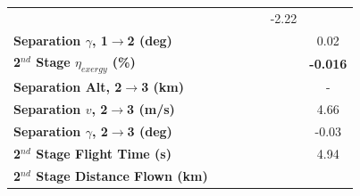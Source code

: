 \begin{table}[!ht]
\begin{tabular}{l c c c c c c}
	& \firstsecondSeparationvmFuelNinetyFiveNoReturn
	& \firstsecondSeparationvmFuelStandardNoReturn
	& \firstsecondSeparationvmFuelOneHundredFiveNoReturn
	& \firstsecondSeparationvmFuelOneHundredTenNoReturn
	&-2.22
	\\
	\textbf{Separation $\gamma$, 1$\rightarrow$2 (deg)}
	& \firstsecondSeparationgammamFuelNinetyNoReturn
	& \firstsecondSeparationgammamFuelNinetyFiveNoReturn
	& \firstsecondSeparationgammamFuelStandardNoReturn
	& \firstsecondSeparationgammamFuelOneHundredFiveNoReturn
	& \firstsecondSeparationgammamFuelOneHundredTenNoReturn
	&0.02
	\\
	\hline 
	\textbf{2$^{nd}$ Stage $\eta_{exergy}$ (\%)}
	& \textbf{\secondExergyEffmFuelNinetyNoReturn}
	& \textbf{\secondExergyEffmFuelNinetyFiveNoReturn}
	& \textbf{\secondExergyEffmFuelStandardNoReturn}
	& \textbf{\secondExergyEffmFuelOneHundredFiveNoReturn}
	& \textbf{\secondExergyEffmFuelOneHundredTenNoReturn}
	& \textbf{-0.016}
	\\
	\textbf{Separation Alt, 2$\rightarrow$3 (km)}
	& \secondthirdSeparationAltmFuelNinetyNoReturn
	& \secondthirdSeparationAltmFuelNinetyFiveNoReturn
	& \secondthirdSeparationAltmFuelStandardNoReturn
	& \secondthirdSeparationAltmFuelOneHundredFiveNoReturn
	& \secondthirdSeparationAltmFuelOneHundredTenNoReturn
	& -
	\\
	\textbf{Separation $v$, 2$\rightarrow$3 (m/s)}
	& \secondthirdSeparationvmFuelNinetyNoReturn
	& \secondthirdSeparationvmFuelNinetyFiveNoReturn
	& \secondthirdSeparationvmFuelStandardNoReturn
	& \secondthirdSeparationvmFuelOneHundredFiveNoReturn
	& \secondthirdSeparationvmFuelOneHundredTenNoReturn
	&4.66
	\\
	\textbf{Separation $\gamma$, 2$\rightarrow$3 (deg)}
	& \secondthirdSeparationgammamFuelNinetyNoReturn
	& \secondthirdSeparationgammamFuelNinetyFiveNoReturn
	& \secondthirdSeparationgammamFuelStandardNoReturn
	& \secondthirdSeparationgammamFuelOneHundredFiveNoReturn
	& \secondthirdSeparationgammamFuelOneHundredTenNoReturn
	&-0.03
	\\
	\textbf{2$^{nd}$ Stage Flight Time (s)}
	& \secondFlightTimemFuelNinetyNoReturn
	& \secondFlightTimemFuelNinetyFiveNoReturn
	& \secondFlightTimemFuelStandardNoReturn
	& \secondFlightTimemFuelOneHundredFiveNoReturn
	& \secondFlightTimemFuelOneHundredTenNoReturn
	&4.94
	\\
	\textbf{2$^{nd}$ Stage Distance Flown (km)}
	& \SecondDistmFuelNinetyNoReturn
	& \SecondDistmFuelNinetyFiveNoReturn
	& \SecondDistmFuelStandardNoReturn
	& \SecondDistmFuelOneHundredFiveNoReturn

\end{tabular}
\end{table}
